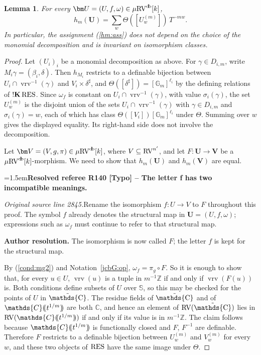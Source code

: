 \documentclass[12pt]{amsart}
\newcommand{\ResolvedRefereeRemark}[5]{%
  \par\medskip\begingroup\normalfont\small\color{gray}%
  \emergencystretch=1.5em\noindent\textbf{Resolved referee R#1 [#2] -- #3.}\par\nobreak\noindent #4\par
  \medskip\color{ResolutionGreen}\noindent\textbf{Author resolution.} #5\par
  \endgroup\medskip
}
\theoremstyle{plain}
\newtheorem{lem}[thm]{Lemma}
\theoremstyle{definition}
\theoremstyle{remark}
\numberwithin{equation}{section}
\theoremstyle{plain}
\newcommand{\RV}{\textup{RV}}
\newcommand{\Z}{\mathds{Z}}
\newcommand{\C}{\mathds{C}}
\newcommand{\G}{\mathds{G}}
\newcommand{\0}{\emptyset}
\newcommand{\dpar}[1]{%
   (\mkern-4mu (#1 )\mkern-4mu )}
\newcommand{\fun}{\longrightarrow}
\newcommand{\sub}{\subseteq}
\newcommand{\mgRV}{{\mu}{\RV}}
\newcommand{\RES}{\textup{RES}}
\DeclareMathOperator{\sggk}{!\mathbf{K}}
\DeclareMathOperator{\vrv}{vrv}
\DeclareMathOperator{\db}{d \! b}
\DeclareMathOperator{\puC}{\tilde \C}
\begin{document}
\begin{lem}\label{muhat:section}
For every $\bm U = (U, f, \omega) \in \mgRV^{\db}[k]$,
\[
h_m(\bm U) = \sum_{w} \Theta([U^{(m)}_w])\, T^{-mw}.
\]
In particular, the  assignment (\ref{hm:ass}) does not depend on the choice of the monomial decomposition and is invariant on isomorphism classes.
\end{lem}
\begin{proof}
Let $(U_i)_i$ be a monomial decomposition as above. For $\gamma \in D_{i,m}$, write $M_i \gamma = (\beta_i, \delta)$. Then $h_{M_i}$ restricts to a definable bijection between $U_i \cap \vrv^{-1}(\gamma)$ and $V_i \times \delta^\sharp$, and $\Theta([\delta^\sharp]) = [\G_m]^{\ell_i}$ by the defining relations of $\sggk \RES$. Since $\omega_f$ is constant on $U_i \cap \vrv^{-1}(\gamma)$, with value $\sigma_i(\gamma)$, the set $U^{(m)}_w$ is the disjoint union of the sets $U_i \cap \vrv^{-1}(\gamma)$ with $\gamma \in D_{i,m}$ and $\sigma_i(\gamma) = w$, each of which has class $\Theta([V_i]) [\G_m]^{\ell_i}$ under $\Theta$. Summing over $w$ gives the displayed equality. Its right-hand side does not involve the decomposition.

Let $\bm V = (V, g, \pi) \in \mgRV^{\db}[k]$, where $V \sub \RV^{n'}$, and let $F : \bm U \fun \bm V$ be a $\mgRV^{\db}[k]$-morphism. We need to show that $h_m(\bm U)$ and $h_m(\bm V)$ are  equal.

\ResolvedRefereeRemark{140}{Typo}{The letter f has two incompatible meanings}{%
\textit{Original source line 2845.}\quad Rename the isomorphism $f:U\fun V$ to $F$ throughout this proof. The symbol $f$ already denotes the structural map in $\bm U=(U,f,\omega)$; expressions such as $\omega_f$ must continue to refer to that structural map.
}{The isomorphism is now called $F$; the letter $f$ is kept for the structural map.}
By (\ref{cond:mg2}) and Notation~\ref{jcbG:op}, $\omega_f = \pi_g \circ F$. So it is enough to show that, for every $u \in U$, $\vrv(u)$ is a tuple in $m^{-1}\Z$ if and only if $\vrv(F(u))$ is. Both conditions define subsets of $U$ over $\mathbb{S}$, so this may be checked for the points of $U$ in $\puC$. The residue fields of $\puC$ and of $\C \dpar{ t^{1/m} }$ are both $\C$, and hence an element of $\RV(\puC)$ lies in $\RV(\C \dpar{ t^{1/m} })$ if and only if its value is in $m^{-1}\Z$. The claim follows because $\C \dpar{ t^{1/m} }$ is functionally closed and $F$, $F^{-1}$ are definable. Therefore $F$ restricts to a definable bijection between $U^{(m)}_w$ and $V^{(m)}_w$ for every $w$, and these two objects of $\RES$ have the same image under $\Theta$.
\end{proof}
\end{document}
